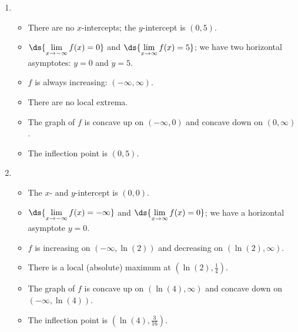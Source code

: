 \documentclass{ximera}
\begin{document}
\begin{enumerate}
\setcounter{enumi}{\value{HW}}

\addtocounter{enumi}{2}

\item  \begin{itemize} \item  There are no $x$-intercepts;  the $y$-intercept is $(0,5)$.

\item  $\ds{\lim_{x \rightarrow -\infty} f(x) = 0}$ and $\ds{\lim_{x \rightarrow \infty} f(x) = 5}$;  we have two horizontal asymptotes: $y = 0$ and $y = 5$.

\item  $f$ is always increasing:  $(-\infty, \infty)$.

\item There are no local extrema.

\item The graph of $f$ is concave up on $(-\infty, 0)$ and concave down on $(0, \infty)$.

\item  The inflection point is $(0, 5)$.


\end{itemize}

\item  \begin{itemize} \item  The $x$- and $y$-intercept is $(0,0)$.

\item  $\ds{\lim_{x \rightarrow -\infty} f(x) = -\infty}$ and $\ds{\lim_{x \rightarrow \infty} f(x) = 0}$;  we have a horizontal asymptote $y = 0$.

\item  $f$ is increasing on $(-\infty, \ln(2))$ and decreasing on $(\ln(2), \infty)$.

\item There is a local (absolute) maximum at $\left( \ln(2), \frac{1}{4}\right)$.

\item The graph of $f$ is concave up on $(\ln(4), \infty)$ and concave down on $(-\infty, \ln(4))$.

\item  The inflection point is $\left(\ln(4), \frac{3}{16} \right)$.


\end{itemize}

\end{enumerate}
\end{document}
